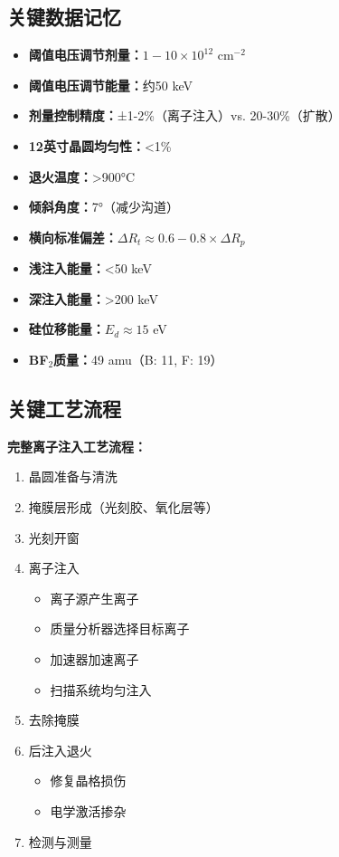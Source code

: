 \documentclass[UTF8,12pt,a4paper]{ctexart}
\begin{document}
\subsection{关键数据记忆}

\begin{itemize}
    \item \textbf{阈值电压调节剂量：}$1-10 \times 10^{12}$ cm$^{-2}$
    \item \textbf{阈值电压调节能量：}约50 keV
    \item \textbf{剂量控制精度：}±1-2\%（离子注入）vs. 20-30\%（扩散）
    \item \textbf{12英寸晶圆均匀性：}<1\%
    \item \textbf{退火温度：}>900°C
    \item \textbf{倾斜角度：}7°（减少沟道）
    \item \textbf{横向标准偏差：}$\Delta R_t \approx 0.6-0.8 \times \Delta R_p$
    \item \textbf{浅注入能量：}<50 keV
    \item \textbf{深注入能量：}>200 keV
    \item \textbf{硅位移能量：}$E_d \approx 15$ eV
    \item \textbf{BF$_2$质量：}49 amu（B: 11, F: 19）
\end{itemize}

\subsection{关键工艺流程}

\textbf{完整离子注入工艺流程：}
\begin{enumerate}
    \item 晶圆准备与清洗
    \item 掩膜层形成（光刻胶、氧化层等）
    \item 光刻开窗
    \item 离子注入
    \begin{itemize}
        \item 离子源产生离子
        \item 质量分析器选择目标离子
        \item 加速器加速离子
        \item 扫描系统均匀注入
    \end{itemize}
    \item 去除掩膜
    \item 后注入退火
    \begin{itemize}
        \item 修复晶格损伤
        \item 电学激活掺杂
    \end{itemize}
    \item 检测与测量
\end{enumerate}
\end{document}
